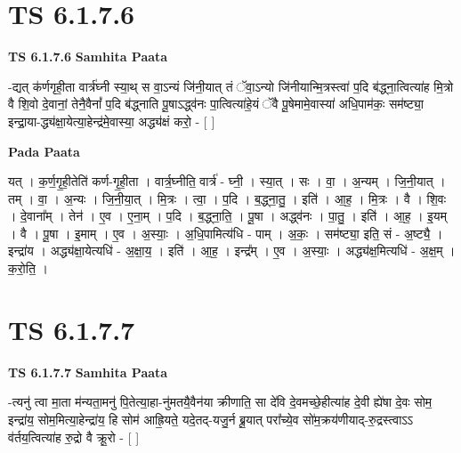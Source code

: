 \documentclass[17pt]{extarticle}
\begin{document}

\section{ TS 6.1.7.6 }

\textbf{TS 6.1.7.6 } \newline
\textbf{Samhita Paata} \newline

-द्यत् क॑र्णगृही॒ता वार्त्र॑घ्नी स्या॒थ् स वा॒ऽन्यं जि॑नी॒यात् तं ॅवा॒ऽन्यो जि॑नीयान्मि॒त्रस्त्वा॑ प॒दि ब॑द्ध्ना॒त्वित्या॑ह मि॒त्रो वै शि॒वो दे॒वानां॒ तेनै॒वैनां᳚ प॒दि ब॑द्ध्नाति पू॒षाऽद्ध्व॑नः पा॒त्वित्या॑हे॒यं ॅवै पू॒षेमामे॒वास्या॑ अधि॒पाम॑कः॒ सम॑ष्ट्या॒ इन्द्रा॒या-द्ध्य॑क्षा॒येत्या॒हेन्द्र॑मे॒वास्या॒ अद्ध्य॑क्षं करो॒ - [  ] \newline

\textbf{Pada Paata} \newline

यत् । क॒र्ण॒गृ॒ही॒तेति॑ कर्ण-गृ॒ही॒ता । वार्त्र॒घ्नीति॒ वार्त्र॑ - घ्नी॒ । स्या॒त् । सः । वा॒ । अ॒न्यम् । जि॒नी॒यात् । तम् । वा॒ । अ॒न्यः । जि॒नी॒या॒त् । मि॒त्रः । त्वा॒ । प॒दि । ब॒द्ध्ना॒तु॒ । इति॑ । आ॒ह॒ । मि॒त्रः । वै । शि॒वः । दे॒वाना᳚म् । तेन॑ । ए॒व । ए॒ना॒म् । प॒दि । ब॒द्ध्ना॒ति॒ । पू॒षा । अद्ध्व॑नः । पा॒तु॒ । इति॑ । आ॒ह॒ । इ॒यम् । वै । पू॒षा । इ॒माम् । ए॒व । अ॒स्याः॒ । अ॒धि॒पामित्य॑धि - पाम् । अ॒कः॒ । सम॑ष्ट्या॒ इति॒ सं - अ॒ष्ट्यै॒ । इन्द्रा॑य । अद्ध्य॑क्षा॒येत्यधि॑ - अ॒क्षा॒य॒ । इति॑ । आ॒ह॒ । इन्द्र᳚म् । ए॒व । अ॒स्याः॒ । अद्ध्य॑क्ष॒मित्यधि॑ - अ॒क्ष॒म् । क॒रो॒ति॒ ।  \newline





\section{ TS 6.1.7.7 }

\textbf{TS 6.1.7.7 } \newline
\textbf{Samhita Paata} \newline

-त्यनु॑ त्वा मा॒ता म॑न्यता॒मनु॑ पि॒तेत्या॒हा-नु॑मतयै॒वैन॑या क्रीणाति॒ सा दे॑वि दे॒वमच्छे॒हीत्या॑ह दे॒वी ह्ये॑षा दे॒वः सोम॒ इन्द्रा॑य॒ सोम॒मित्या॒हेन्द्रा॑य॒ हि सोम॑ आह्रि॒यते॒ यदे॒तद्-यजु॒र्न ब्रू॒यात् परा᳚च्ये॒व सो॑म॒क्रय॑णीयाद्-रु॒द्रस्त्वाऽऽ व॑र्तय॒त्वित्या॑ह रु॒द्रो वै क्रू॒रो - [  ] \newline
\end{document}
